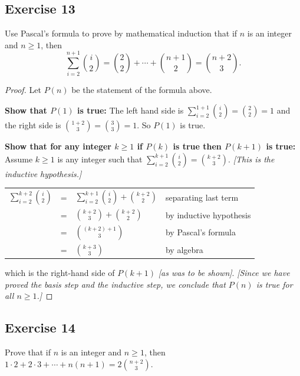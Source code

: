 \documentclass[14pt]{extarticle}
\newcommand{\dps}{\displaystyle}
\newcommand{\cy}{\color{cyan}}
\begin{document}
\subsection{Exercise 13}
Use Pascal’s formula to prove by mathematical induction that if \(n\) is an integer and \(n \geq 1\), then
\[
     \sum_{i=2}^{n+1}\binom{i}{2} = \binom{2}{2} + \cdots + \binom{n+1}{2} = \binom{n+2}{3}.
\]
\begin{proof}
     Let \(P(n)\) be the statement of the formula above.

          {\bf Show that \(P(1)\) is true:} The left hand side is \(\sum_{i=2}^{1+1}\binom{i}{2} = \binom{2}{2} = 1\) and the
     right side is \(\binom{1+2}{3} = \binom{3}{3} = 1\). So \(P(1)\) is true.

          {\bf Show that for any integer \(k \geq 1\) if \(P(k)\) is true then \(P(k+1)\) is true:} Assume \(k \geq 1\) is any
     integer such that \(\sum_{i=2}^{k+1} \binom{i}{2} = \binom{k+2}{3}\). {\it [This is the inductive hypothesis.]}
     \begin{center}
          \begin{tabular}{rcll}
               \(\dps \sum_{i=2}^{k+2} \binom{i}{2}\) & = & \(\dps \sum_{i=2}^{k+1} \binom{i}{2} + \binom{k+2}{2}\) & {\cy separating last
               term}                                                                                                                                \\
                                                      & = & \(\dps \binom{k+2}{3} + \binom{k+2}{2}\)                & {\cy by inductive hypothesis} \\
                                                      & = & \(\dps \binom{(k+2)+1}{3}\)                             & {\cy by Pascal's formula}     \\
                                                      & = & \(\dps \binom{k+3}{3}\)                                 & {\cy by algebra}
          \end{tabular}
     \end{center}
     which is the right-hand side of \(P(k + 1)\) {\it [as was to be shown]}. {\it [Since we have proved the basis step and the
          inductive step, we conclude that \(P(n)\) is true for all \(n \geq 1\).]}
\end{proof}

\subsection{Exercise 14}
Prove that if \(n\) is an integer and \(n \geq 1\), then \(1 \cdot 2 + 2 \cdot 3 + \cdots + n(n + 1) = 2 \binom{n+2}{3}\).
\end{document}
